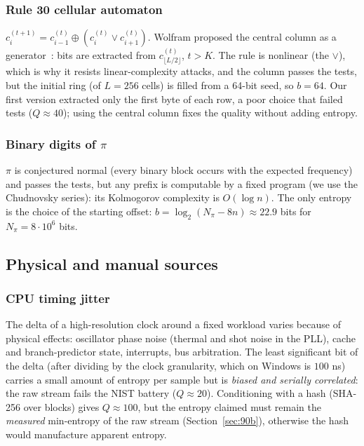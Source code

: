 \documentclass[11pt,a4paper]{article}
\theoremstyle{plain}
\theoremstyle{definition}
\begin{document}
\subsubsection{Rule 30 cellular automaton}

$c_i^{(t+1)}=c_{i-1}^{(t)}\oplus(c_i^{(t)}\lor c_{i+1}^{(t)})$. Wolfram proposed
the central column as a generator~\cite{wolfram86}: bits are extracted from
$c_{\lfloor L/2\rfloor}^{(t)}$, $t>K$. The rule is nonlinear (the $\lor$),
which is why it resists linear-complexity attacks, and the column passes the
tests, but the initial ring (of $L=256$ cells) is filled from a 64-bit seed, so
$b=64$. Our first version extracted only the first byte of each row, a poor
choice that failed tests ($Q\approx40$); using the central column fixes the
quality without adding entropy.

\subsubsection{Binary digits of $\pi$}

$\pi$ is conjectured normal (every binary block occurs with the expected
frequency) and passes the tests, but any prefix is computable by a fixed
program (we use the Chudnovsky series): its Kolmogorov complexity is
$O(\log n)$. The only entropy is the choice of the starting offset:
$b=\log_2(N_\pi-8n)\approx 22.9$ bits for $N_\pi=8\cdot10^6$ bits.

\subsection{Physical and manual sources}

\subsubsection{CPU timing jitter}

The delta of a high-resolution clock around a fixed workload varies because of
physical effects: oscillator phase noise (thermal and shot noise in the PLL),
cache and branch-predictor state, interrupts, bus arbitration. The least
significant bit of the delta (after dividing by the clock granularity, which on
Windows is $100$ ns) carries a small amount of entropy per sample but is
\emph{biased and serially correlated}: the raw stream fails the NIST battery
($Q\approx20$). Conditioning with a hash (SHA-256 over blocks) gives
$Q\approx100$, but the entropy claimed must remain the \emph{measured}
min-entropy of the raw stream (Section~\ref{sec:90b}), otherwise the hash would
manufacture apparent entropy.
\end{document}
